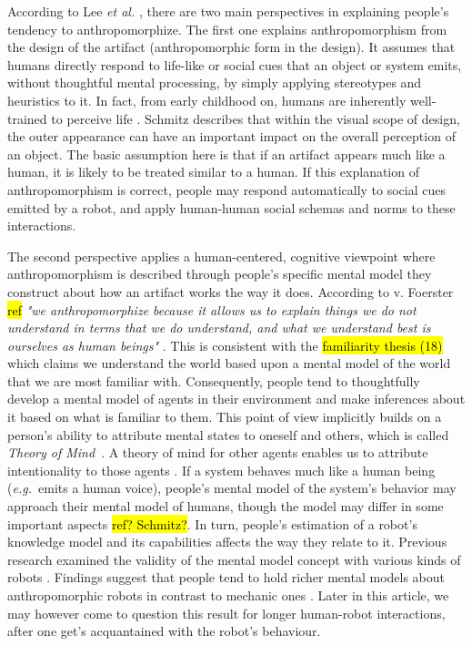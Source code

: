 \documentclass{frontiersSCNS} %
\newcommand{\eg}{{\textit{e.g.~}}}
\begin{document}
According to Lee \textit{et al.} \cite{lee_human_2005}, there are two main
perspectives in explaining people's tendency to anthropomorphize. The first
one explains anthropomorphism from the design of the artifact
(anthropomorphic form in the design). It assumes that humans directly
respond to life-like or social cues that an object or system emits, without
thoughtful mental processing, by simply applying stereotypes and heuristics
to it. In fact, from early childhood on, humans are inherently well-trained
to perceive life \cite{epley_seeing_2007}. Schmitz
\cite{schmitz_concepts_2011} describes that within the visual scope of
design, the outer appearance can have an important impact on the overall
perception of an object. The basic assumption here is that if an artifact
appears much like a human, it is likely to be treated similar to a human. If
this explanation of anthropomorphism is correct, people may respond
automatically to social cues emitted by a robot, and apply human-human
social schemas and norms to these interactions.

The second perspective applies a human-centered, cognitive viewpoint where
anthropomorphism is described through people's specific mental model they
construct about how an artifact works the way it does. According to v.
Foerster \hl{ref} \textit{"we anthropomorphize because it allows us to
explain things we do not understand in terms that we do understand, and what
we understand best is ourselves as human beings"}
\cite{hegel_understanding_2008}. This is consistent with the \hl{familiarity
thesis (18)} \cite{hegel_understanding_2008} which claims we understand the
world based upon a mental model of the world that we are most familiar with.
Consequently, people tend to thoughtfully develop a mental model of agents in
their environment and make inferences about it based on what is familiar to
them. This point of view implicitly builds on a person's ability to attribute
mental states to oneself and others, which is called \textit{Theory of
Mind}~\cite{Premack1978}. A theory of  mind for other agents enables us to
attribute intentionality to those agents
\cite{leslie_pretense_1987,admoni_multi-category_2012}. If a system behaves much
like a human being (\eg emits a human voice), people's mental model of the
system's behavior may approach their mental model of humans, though the model
may differ in some important aspects \hl{ref? Schmitz?}. In turn, people's
estimation of a robot's knowledge model and its capabilities affects the way
they relate to it. Previous research examined the validity of the mental model
concept with various kinds of robots
\cite{schmitz_concepts_2011,kiesler_mental_2002}. Findings suggest that people
tend to hold richer mental models about anthropomorphic robots in contrast to
mechanic ones \cite{kiesler_mental_2002}. Later in this article, we may however
come to question this result for longer human-robot interactions, after one
get's acquantained with the robot's behaviour.
\end{document}
